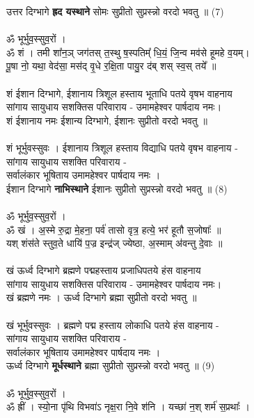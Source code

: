 उत्तर दिग्भागे \textbf{ह्रद यस्थाने} सोमः सुप्रीतो सुप्रस्न्नो वरदो भवतु ॥ (7)\\
\\
ॐ भूर्भुव॒स्सुव॒रों ।\\
{\small ॐ} शं । तमी शा᳚न॒ञ् जग॑तस् त॒स्थु ष॒स्पतिम्᳚ धि॒यं॒ जि॒न्व मव॑से हूमहे व॒यम्।\\
पू॒षा नो॒ यथा॒ वेद॑सा॒ मस॑द् वृ॒धे र॒क्षि॒ता पायु॒र द॑ब् शस् स्व॒स् तये᳚ ॥\\
\\
{\small शं ईशान दिग्भागे, ईशानाय त्रिशूल हस्ताय भूताधि पतये वृषभ वाहनाय\\
सांगाय सायुधाय सशक्तिस परिवाराय -  उमामहेश्वर पार्षदाय नमः।\\
शं ईशानाय नमः  ईशान्य दिग्भागे, ईशानः सुप्रीतो  वरदो भवतु ॥}\\
\\
शं भूर्भुवस्सुवः । ईशानाय त्रिशूल हस्ताय विद्याधि पतये वृषभ वाहनाय -\\
सांगाय सायुधाय सशक्ति परिवाराय -\\
सर्वालंकार भूषिताय उमामहेश्वर पार्षदाय नमः ।\\
ईशान दिग्भागे \textbf{नाभिस्थाने} ईशानः सुप्रीतो सुप्रस्न्नो वरदो भवतु ॥ (8)\\
\\
ॐ भूर्भुव॒स्सुव॒रों ।\\
{\small ॐ} खं । अ॒स्मे रु॒द्रा मे॒हना॒ पर्व॑ तासो वृत्र॒ हत्ये॒ भर॑ हूतौ स॒जोषाः᳚ ॥\\
यश् शंस॑ते स्तुव॒ते धायि॑ प॒ज्र इन्द्र॑ज् ज्येष्ठा, अ॒स्माम् अ॑वन्तु दे॒वाः ॥\\
\\
{\small खं ऊर्ध्व दिग्भागे ब्रह्मणे पद्महस्ताय प्रजाधिपतये हंस वाहनाय\\
सांगाय सायुधाय सशक्तिस परिवाराय -  उमामहेश्वर पार्षदाय नमः।\\
खं ब्रह्मणे नमः । ऊर्ध्व दिग्भागे ब्रह्मा सुप्रीतो  वरदो भवतु ॥}\\
\\
खं भूर्भुवस्सुवः । ब्रह्मणे पद्म हस्ताय लोकाधि पतये हंस वाहनाय -\\
सांगाय सायुधाय सशक्ति परिवाराय -\\
सर्वालंकार भूषिताय उमामहेश्वर पार्षदाय नमः ।\\
ऊर्ध्व दिग्भागे \textbf{मूर्धस्थाने} ब्रह्मा सुप्रीतो सुप्रस्न्नो वरदो भवतु ॥ (9)\\
\\
ॐ भूर्भुव॒स्सुव॒रों ।\\
{\small ॐ} ह्रीं । स्यो॒ना पृ॑थि विभवा॑ऽ नृक्ष॒रा नि॒वे श॑नि । यच्छा॑ न॒श् शर्म॑ स॒प्रथाः᳚ ।\\

